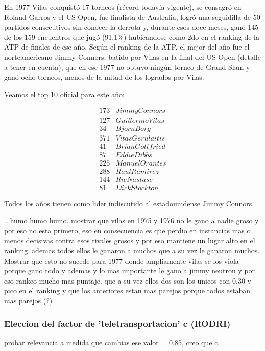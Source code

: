 En 1977 Vilas conquistó 17 torneos (récord todavía vigente), se consagró en Roland Garros y el US Open, fue finalista de Australia, logró una seguidilla de 50 partidos consecutivos sin conocer la derrota y, durante esos doce meses, ganó 145 de los 159 encuentros que jugó (91,1\%) hubicandose como 2do en el ranking de la ATP de finales de ese año.
Según el ranking de la ATP, el mejor del año fue el norteamericano Jimmy Connors, batido por Vilas en la final del US Open (detalle a tener en cuenta), que en ese 1977 no obtuvo ningún torneo de Grand Slam y ganó ocho torneos, menos de la mitad de los logrados por Vilas.  


Veamos el top 10 oficial para este año:

\begin{eqnarray*}
173 & Jimmy Connors \\
127 & Guillermo Vilas \\
34 & Bjorn Borg \\
371 & Vitas Gerulaitis \\
41 & Brian Gottfried \\
87 & Eddie Dibbs \\
225 & Manuel Orantes \\
288 & Raul Ramirez \\
144 & Ilie Nastase \\
81 & Dick Stockton 
\end{eqnarray*}

Todos los años tienen como lider indiscutido al estadounidense Jimmy Connors.




...humo humo humo. mostrar que vilas en 1975 y 1976 no le gano a nadie groso y por eso no esta primero, eso en consecuencia es que perdio en instancias mas o menos decisivas contra esos rivales grosos y por eso mantiene un lugar alto en el ranking..ademas todos ellos le ganaron a muchos que a su vez le ganaron muchos. 
Mostrar que esto no sucede para 1977 donde ampliamente vilas se los viola porque gano todo y ademas y lo mas importante le gano a jimmy neutron y por eso rankeo mucho mas puntaje. que a su vez ellos dos son los unicos con 0.30 y pico en el ranking y que los anteriores estan mas parejos porque todos estaban mas parejos (?) 

\subsubsection{Eleccion del factor de 'teletransportacion' c (RODRI)}
probar relevancia a medida que cambias ese valor = 0.85, creo que c.

